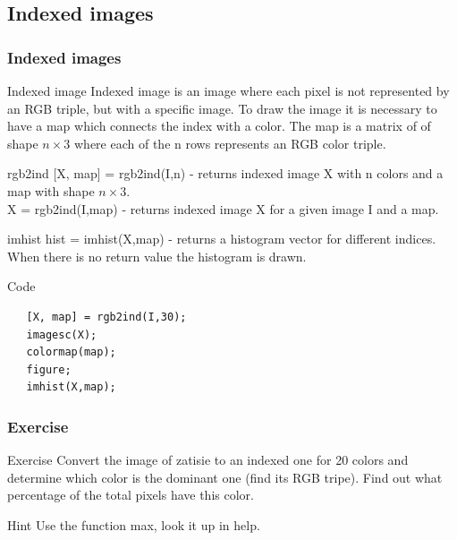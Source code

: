\documentclass{beamer}
\begin{document}
\subsection{Indexed images}
\begin{frame}[fragile]
\frametitle{Indexed images}
  \begin{block}{Indexed image}
  Indexed image is an image where each pixel is not represented by an RGB triple, but with a specific image. To draw the image it is necessary to have a map which connects the index with a color. The map is a matrix of of shape  $n \times 3$ where each of the n rows represents an RGB color triple.

  \end{block} 
\end{frame}

\begin{frame}[fragile]

  \begin{block}{rgb2ind}
  [X, map] = rgb2ind(I,n) - returns indexed image X with n colors and a map with shape $n \times 3$. \\
    X = rgb2ind(I,map) - returns indexed image X for a given image I and a map.
  \end{block}   
  
  
    \begin{block}{imhist}
  hist = imhist(X,map) - returns a histogram vector for different indices. When there is no return value the histogram is drawn.
  \end{block} 
  
  \begin{block}{Code}
  \begin{verbatim}
   [X, map] = rgb2ind(I,30);
   imagesc(X);
   colormap(map);
   figure;
   imhist(X,map);\end{verbatim}
  \end{block} 
\end{frame}


\begin{frame}
\frametitle{Exercise}    
  \begin{block}{Exercise}
  Convert the image of zatisie to an indexed one for 20 colors and determine which color is the dominant one (find its RGB tripe). Find out what percentage of the total pixels have this color.
  \end{block}   
  
  \begin{block}{Hint}
  Use the function max, look it up in help.
  \end{block}  
\end{frame}
\end{document}
